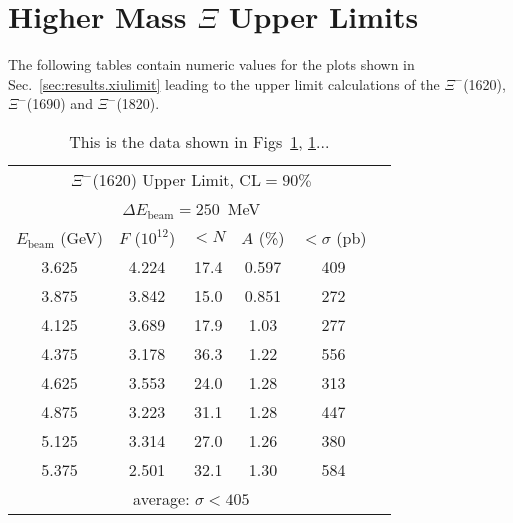 \section{\label{sec:app.tab.xiulimit}Higher Mass \texorpdfstring{$\Xi$}{Xi} Upper Limits}

The following tables contain numeric values for the plots shown in Sec.~\ref{sec:results.xiulimit} leading to the upper limit calculations of the $\Xi^-$(1620), $\Xi^-$(1690) and $\Xi^-$(1820).

\begin{table}[bh]\begin{center}
\caption[\texorpdfstring{$\Xi^-$}{Xi-}(1620) Upper Limit]{\label{tab:xi1620.ulimit}This is the data shown in Figs~\ref{}, \ref{}...}
\begin{tabular}{cccccc}
\hline \hline
\multicolumn{5}{c}{$\Xi^-$(1620) Upper Limit, CL$ = 90\%$} \\
\multicolumn{5}{c}{$\Delta E_\mathrm{beam} = 250$~MeV} \\
\hline
$E_\mathrm{beam}$ (GeV) & $F$ ($10^{12}$) & $< N$ & $A$ (\%) & $< \sigma$ (pb) \\
\hline
3.625 & 4.224 & 17.4 & 0.597 & 409 \\
3.875 & 3.842 & 15.0 & 0.851 & 272 \\
4.125 & 3.689 & 17.9 & 1.03 & 277 \\
4.375 & 3.178 & 36.3 & 1.22 & 556 \\
4.625 & 3.553 & 24.0 & 1.28 & 313 \\
4.875 & 3.223 & 31.1 & 1.28 & 447 \\
5.125 & 3.314 & 27.0 & 1.26 & 380 \\
5.375 & 2.501 & 32.1 & 1.30 & 584 \\
\hline
\multicolumn{5}{c}{average: $\sigma < 405$} \\
\hline \hline
\end{tabular}

\end{center}\end{table}

